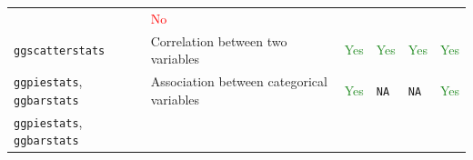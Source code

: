 \documentclass[]{article}
\begin{document}
\begin{longtable}[]{@{}llllll@{}}
\begin{minipage}[t]{0.08\columnwidth}
\end{minipage} & \begin{minipage}[t]{0.10\columnwidth}\raggedright
\textcolor{red}{No}\strut
\end{minipage}\tabularnewline
\begin{minipage}[t]{0.14\columnwidth}\raggedright
\texttt{ggscatterstats}\strut
\end{minipage} & \begin{minipage}[t]{0.35\columnwidth}\raggedright
Correlation between two variables\strut
\end{minipage} & \begin{minipage}[t]{0.08\columnwidth}\raggedright
\textcolor{ForestGreen}{Yes}\strut
\end{minipage} & \begin{minipage}[t]{0.10\columnwidth}\raggedright
\textcolor{ForestGreen}{Yes}\strut
\end{minipage} & \begin{minipage}[t]{0.08\columnwidth}\raggedright
\textcolor{ForestGreen}{Yes}\strut
\end{minipage} & \begin{minipage}[t]{0.10\columnwidth}\raggedright
\textcolor{ForestGreen}{Yes}\strut
\end{minipage}\tabularnewline
\begin{minipage}[t]{0.14\columnwidth}\raggedright
\texttt{ggpiestats}, \texttt{ggbarstats}\strut
\end{minipage} & \begin{minipage}[t]{0.35\columnwidth}\raggedright
Association between categorical variables\strut
\end{minipage} & \begin{minipage}[t]{0.08\columnwidth}\raggedright
\textcolor{ForestGreen}{Yes}\strut
\end{minipage} & \begin{minipage}[t]{0.10\columnwidth}\raggedright
\texttt{NA}\strut
\end{minipage} & \begin{minipage}[t]{0.08\columnwidth}\raggedright
\texttt{NA}\strut
\end{minipage} & \begin{minipage}[t]{0.10\columnwidth}\raggedright
\textcolor{ForestGreen}{Yes}\strut
\end{minipage}\tabularnewline
\begin{minipage}[t]{0.14\columnwidth}\raggedright
\texttt{ggpiestats}, \texttt{ggbarstats}\strut
\end{minipage} & \begin{minipage}[t]{0.35\columnwidth}\raggedright

\end{minipage}
\end{longtable}
\end{document}
